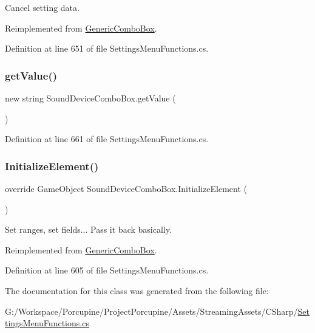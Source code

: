 Cancel setting data. 



Reimplemented from \hyperlink{class_generic_combo_box_a0949a84cf1e33d13346cb90597e005ce}{Generic\+Combo\+Box}.



Definition at line 651 of file Settings\+Menu\+Functions.\+cs.

\mbox{\label{class_sound_device_combo_box_ac4569464e277f78b93663d39e116d06d}} 
\subsubsection{\texorpdfstring{get\+Value()}{getValue()}}
{\footnotesize\ttfamily new string Sound\+Device\+Combo\+Box.\+get\+Value (\begin{DoxyParamCaption}{ }\end{DoxyParamCaption})}



Definition at line 661 of file Settings\+Menu\+Functions.\+cs.

\mbox{\label{class_sound_device_combo_box_a20c9540411ea0e9248b54f5a54725290}} 
\subsubsection{\texorpdfstring{Initialize\+Element()}{InitializeElement()}}
{\footnotesize\ttfamily override Game\+Object Sound\+Device\+Combo\+Box.\+Initialize\+Element (\begin{DoxyParamCaption}{ }\end{DoxyParamCaption})\hspace{0.3cm}{\ttfamily [virtual]}}



Set ranges, set fields... Pass it back basically. 



Reimplemented from \hyperlink{class_generic_combo_box_ae1800a7c68d3af046a2b147e117437ff}{Generic\+Combo\+Box}.



Definition at line 605 of file Settings\+Menu\+Functions.\+cs.



The documentation for this class was generated from the following file\+:\begin{DoxyCompactItemize}
\item 
G\+:/\+Workspace/\+Porcupine/\+Project\+Porcupine/\+Assets/\+Streaming\+Assets/\+C\+Sharp/\hyperlink{_settings_menu_functions_8cs}{Settings\+Menu\+Functions.\+cs}\end{DoxyCompactItemize}
